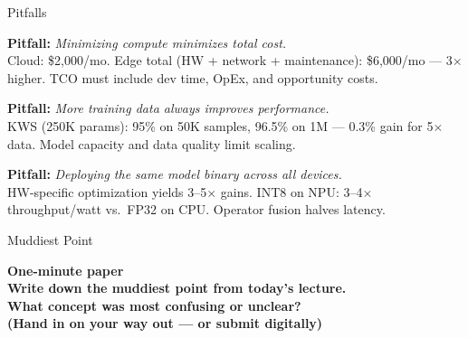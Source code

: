 \documentclass[aspectratio=169, 12pt]{beamer}
\begin{document}
\begin{frame}{Pitfalls}
\note{
%
%
%
%
}

\footnotesize
\textbf{Pitfall:} \textit{Minimizing compute minimizes total cost.}\\
Cloud: \$2,000/mo. Edge total (HW + network + maintenance): \$6,000/mo --- 3$\times$ higher. TCO must include dev time, OpEx, and opportunity costs.

\vspace{0.1cm}
\textbf{Pitfall:} \textit{More training data always improves performance.}\\
KWS (250K params): 95\% on 50K samples, 96.5\% on 1M --- 0.3\% gain for 5$\times$ data. Model capacity and data quality limit scaling.

\vspace{0.1cm}
\textbf{Pitfall:} \textit{Deploying the same model binary across all devices.}\\
HW-specific optimization yields 3--5$\times$ gains. INT8 on NPU: 3--4$\times$ throughput/watt vs.\ FP32 on CPU. Operator fusion halves latency.

\end{frame}


\begin{frame}{Muddiest Point}
\note{
%
%
}

\centering
\Large\bfseries One-minute paper\\[0.5cm]
\normalsize Write down the \textbf{muddiest point} from today's lecture.\\[0.2cm]
{\small What concept was most confusing or unclear?}\\[0.5cm]
{\footnotesize\textcolor{midgray}{(Hand in on your way out --- or submit digitally)}}
\end{frame}
\end{document}
